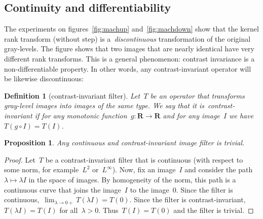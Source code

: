 \documentclass[12pt]{article}                  %
\newtheorem{definition}{Definition}
\newtheorem{proposition}{Proposition}
\begin{document}
%
%
%
%


\subsection{Continuity and differentiability}

The experiments on figures~\ref{fig:machup} and~\ref{fig:machdown} show that
the kernel rank transform (without step) is a~\emph{discontinuous}
transformation of the original gray-levels.  The figure shows that two
images that are nearly identical have very different rank transforms.  This
is a general phenomenon: contrast invariance is a non-differentiable
property.  In other words, any contrast-invariant operator will be likewise
discontinuous:

\begin{definition}[contrast-invariant filter]
	Let~$T$ be an operator that transforms gray-level images into images
	of the same type.  We say that it is~\emph{contrast-invariant} if
	for any
	monotonic function~$g:\mathbf{R}\to\mathbf{R}$ and for any image~$I$
	we have~$T(g\circ I)=T(I)$.
\end{definition}

\begin{proposition}
	Any continuous and contrast-invariant image filter is trivial.
\end{proposition}
\begin{proof}
	Let~$T$ be a contrast-invariant filter that is continuous (with
	respect to some norm, for example~$L^2$ or~$L^\infty$).
	Now, fix an image~$I$ and consider the
	path~$\lambda\mapsto \lambda I$ in the space of images.  By
	homogeneity of the norm, this path
	is a continuous curve that joins the image~$I$ to the image~$0$.
	Since the filter is continuous,~$\displaystyle\lim_{\lambda\to
	0+}T(\lambda I)=T(0)$.
	Since the filter is contrast-invariant,~$T(\lambda I)=T(I)$
	for all~$\lambda>0$.
	Thus~$T(I)=T(0)$ and the filter is trivial.
\end{proof}
\end{document}
